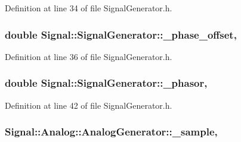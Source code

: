 Definition at line 34 of file Signal\+Generator.\+h.

\hypertarget{classSignal_1_1SignalGenerator_a6b4444d46747c8517171edbbf4b5588f}{
\subsubsection[{\+\_\+phase\+\_\+offset}]{\setlength{\rightskip}{0pt plus 5cm}double Signal\+::\+Signal\+Generator\+::\+\_\+phase\+\_\+offset\hspace{0.3cm}{\ttfamily [protected]}, {\ttfamily [inherited]}}}\label{classSignal_1_1SignalGenerator_a6b4444d46747c8517171edbbf4b5588f}


Definition at line 36 of file Signal\+Generator.\+h.

\hypertarget{classSignal_1_1SignalGenerator_af4aa0728ded00777be26a06d883eaeb3}{
\subsubsection[{\+\_\+phasor}]{\setlength{\rightskip}{0pt plus 5cm}double Signal\+::\+Signal\+Generator\+::\+\_\+phasor\hspace{0.3cm}{\ttfamily [protected]}, {\ttfamily [inherited]}}}\label{classSignal_1_1SignalGenerator_af4aa0728ded00777be26a06d883eaeb3}


Definition at line 42 of file Signal\+Generator.\+h.

\hypertarget{classSignal_1_1Analog_1_1AnalogGenerator_a8750d751c4dbc67084dfc74ab9a6a763}{
\subsubsection[{\+\_\+sample}]{ Signal\+::\+Analog\+::\+Analog\+Generator\+::\+\_\+sample\hspace{0.3cm}{\ttfamily [protected]}, {\ttfamily [inherited]}}}\label{classSignal_1_1Analog_1_1AnalogGenerator_a8750d751c4dbc67084dfc74ab9a6a763}


